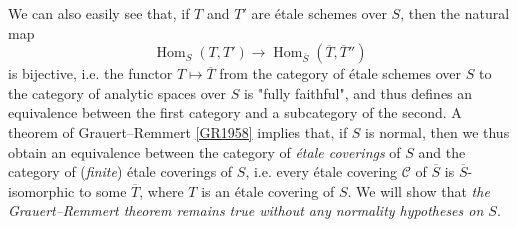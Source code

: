   We can also easily see that, if \(T\) and \(T'\) are étale schemes over \(S\), then the natural map
  \[     \operatorname {Hom}_S(T,T') \to  \operatorname {Hom}_{\overline {S}}(\overline {T},\overline {T}'')   \]
  is bijective, i.e. the functor \(T\mapsto \overline {T}\) from the category of étale schemes over \(S\) to the category of analytic spaces over \(S\) is "fully faithful", and thus defines an equivalence between the first category and a subcategory of the second.
  A theorem of Grauert–Remmert \hyperref[GR1958]{[GR1958]} implies that, if \(S\) is normal, then we thus obtain an equivalence between the category of \emph{étale coverings} of \(S\) and the category of (\emph{finite}) étale coverings of \(S\), i.e. every étale covering \(\mathscr {C}\) of \(\overline {S}\) is \(\overline {S}\)-isomorphic to some \(\overline {T}\), where \(T\) is an étale covering of \(S\).
  We will show that \emph{the Grauert–Remmert theorem remains true without any normality hypotheses on \(S\)}.
  
